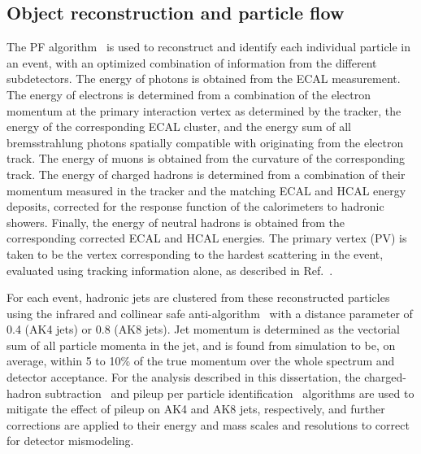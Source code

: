 \subsection{Object reconstruction and particle flow}

The PF algorithm~\cite{CMS:2017yfk} is used to reconstruct and identify each individual particle in an event, with an optimized combination of information from the different subdetectors.
The energy of photons is obtained from the ECAL measurement.
The energy of electrons is determined from a combination of the electron momentum at the primary interaction vertex as determined by the tracker, the energy of the corresponding ECAL cluster, and the energy sum of all bremsstrahlung photons spatially compatible with originating from the electron track.
The energy of muons is obtained from the curvature of the corresponding track.
The energy of charged hadrons is determined from a combination of their momentum measured in the tracker and the matching ECAL and HCAL energy deposits, corrected for the response function of the calorimeters to hadronic showers.
Finally, the energy of neutral hadrons is obtained from the corresponding corrected ECAL and HCAL energies.
The primary vertex (PV) is taken to be the vertex corresponding to the hardest scattering in the event, evaluated using tracking information alone, as described in Ref.~\cite{CMS-TDR-15-02}.

For each event, hadronic jets are clustered from these reconstructed particles using the infrared and collinear safe anti-\kt algorithm~\cite{Cacciari:2008gp, Cacciari:2011ma} with a distance parameter of 0.4 (AK4 jets) or 0.8 (AK8 jets).
Jet momentum is determined as the vectorial sum of all particle momenta in the jet, and is found from simulation to be, on average, within 5 to 10\% of the true momentum over the whole \pt spectrum and detector acceptance.
For the analysis described in this dissertation, the charged-hadron subtraction~\cite{CMS:2014ata} and pileup per particle identification~\cite{Bertolini:2014bba, Sirunyan:2020foa} algorithms are used to mitigate the effect of pileup on AK4 and AK8 jets, respectively, and further corrections are applied to their energy and mass scales and resolutions to correct for detector mismodeling.

